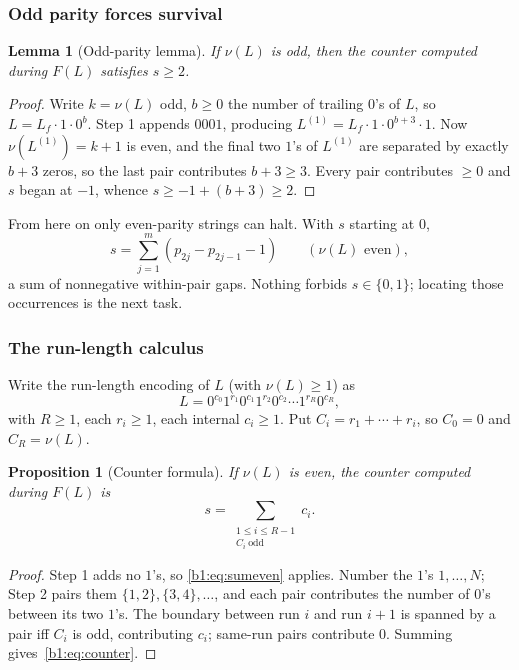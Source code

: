\documentclass[a4paper]{article}
\theoremstyle{plain}
\newtheorem{proposition}{Proposition}[subsection]
\newtheorem{lemma}{Lemma}[subsection]
\theoremstyle{definition}
\theoremstyle{remark}
\begin{document}
\subsubsection{Odd parity forces survival}\label{b1:sec:odd}
\begin{lemma}[Odd-parity lemma]\label{b1:lem:odd}
If $\nu(L)$ is odd, then the counter computed during $F(L)$ satisfies $s\ge 2$.
\end{lemma}
\begin{proof}
Write $k=\nu(L)$ odd, $b\ge 0$ the number of trailing $0$'s of $L$, so $L=L_f\cdot 1\cdot 0^b$. Step 1 appends $0001$, producing $L^{(1)}=L_f\cdot 1\cdot 0^{b+3}\cdot 1$. Now $\nu(L^{(1)})=k+1$ is even, and the final two $1$'s of $L^{(1)}$ are separated by exactly $b+3$ zeros, so the last pair contributes $b+3\ge 3$. Every pair contributes $\ge 0$ and $s$ began at $-1$, whence $s\ge -1+(b+3)\ge 2$.
\end{proof}

From here on only even-parity strings can halt. With $s$ starting at $0$,
\begin{equation}\label{b1:eq:sumeven}
s=\sum_{j=1}^{m}(p_{2j}-p_{2j-1}-1)\qquad(\nu(L)\text{ even}),
\end{equation}
a sum of nonnegative within-pair gaps. Nothing forbids $s\in\{0,1\}$; locating those occurrences is the next task.

\subsubsection{The run-length calculus}\label{b1:sec:rl}
Write the run-length encoding of $L$ (with $\nu(L)\ge 1$) as
\begin{equation}\label{b1:eq:rle}
L=0^{c_0}1^{r_1}0^{c_1}1^{r_2}0^{c_2}\cdots 1^{r_R}0^{c_R},
\end{equation}
with $R\ge 1$, each $r_i\ge 1$, each internal $c_i\ge 1$. Put $C_i=r_1+\cdots+r_i$, so $C_0=0$ and $C_R=\nu(L)$.

\begin{proposition}[Counter formula]\label{b1:prop:counter}
If $\nu(L)$ is even, the counter computed during $F(L)$ is
\begin{equation}\label{b1:eq:counter}
s=\sum_{\substack{1\le i\le R-1\\C_i\ \text{odd}}}c_i.
\end{equation}
\end{proposition}
\begin{proof}
Step 1 adds no $1$'s, so \eqref{b1:eq:sumeven} applies. Number the $1$'s $1,\dots,N$; Step 2 pairs them $\{1,2\},\{3,4\},\dots$, and each pair contributes the number of $0$'s between its two $1$'s. The boundary between run $i$ and run $i+1$ is spanned by a pair iff $C_i$ is odd, contributing $c_i$; same-run pairs contribute $0$. Summing gives~\eqref{b1:eq:counter}.
\end{proof}
\end{document}
